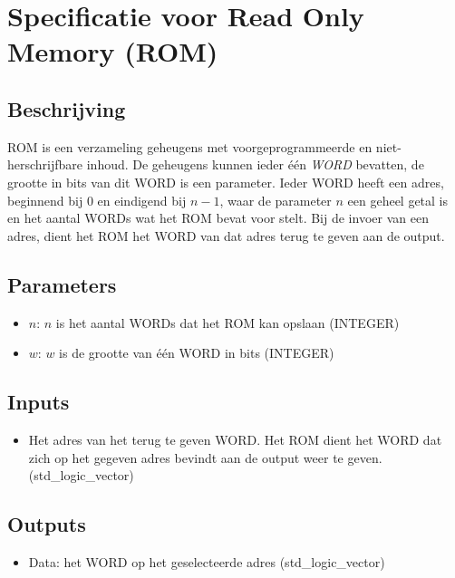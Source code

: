 \documentclass{article}
\begin{document}
\section{Specificatie voor Read Only Memory (ROM)}
\subsection{Beschrijving}
ROM is een verzameling geheugens met voorgeprogrammeerde en niet-herschrijfbare inhoud. De geheugens kunnen ieder één \textit{WORD} bevatten, de grootte in bits van dit WORD is een parameter. Ieder WORD heeft een adres, beginnend bij 0 en eindigend bij $n-1$, waar de parameter $n$ een geheel getal is en het aantal WORDs wat het ROM bevat voor stelt. Bij de invoer van een adres, dient het ROM het WORD van dat adres terug te geven aan de output.
\subsection{Parameters}
\begin{itemize}
	\item $n$: $n$ is het aantal WORDs dat het ROM kan opslaan (INTEGER)
	\item $w$: $w$ is de grootte van één WORD in bits (INTEGER)
\end{itemize}
\subsection{Inputs}
\begin{itemize}
	\item Het adres van het terug te geven WORD. Het ROM dient het WORD dat zich op het gegeven adres bevindt aan de output weer te geven. (std_logic_vector)
\end{itemize}
\subsection{Outputs}
\begin{itemize}
	\item Data: het WORD op het geselecteerde adres (std_logic_vector)
\end{itemize}
\end{document}
